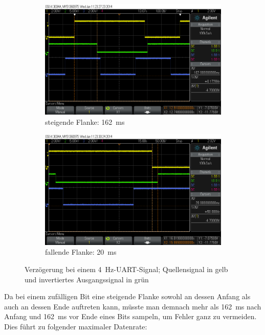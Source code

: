 \documentclass[12pt,a4paper]{article}
\begin{document}
\begin{figure}[H]
  \centering
  \begin{subfigure}[b]{0.6\textwidth}
    \includegraphics[width=\textwidth]{../measurements/20140611/4Hz_rising_edge/scope_2.png}
    \caption{steigende Flanke: \SI{162}{\milli\second}}
    \label{fig:uart_4hz_rising_edge}
  \end{subfigure}
  \begin{subfigure}[b]{0.6\textwidth}
    \includegraphics[width=\textwidth]{../measurements/20140611/4Hz_falling_edge/scope_6.png}
    \caption{fallende Flanke: \SI{20}{\milli\second}}
    \label{fig:uart_4hz_falling_edge}
  \end{subfigure}
  \caption{Verzögerung bei einem \SI{4}{\hertz}-UART-Signal; Quellensignal in gelb und invertiertes Ausgangssignal in grün}
  \label{fig:uart_4hz_edge}
\end{figure}

Da bei einem zufälligen Bit eine steigende Flanke sowohl an dessen Anfang als auch an dessen Ende auftreten kann, müsste man demnach mehr als \SI{162}{\milli\second} nach Anfang und \SI{162}{\milli\second} vor Ende eines Bits sampeln, um Fehler ganz zu vermeiden. Dies führt zu folgender maximaler Datenrate:
\end{document}
